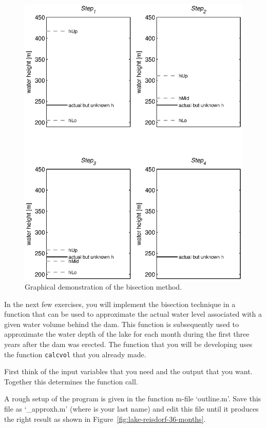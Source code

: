 \begin{figure}[htbp]
  \centering
    \includegraphics[width=1.0\textwidth]{./../eps/water-levels.eps}
  \caption{Graphical demonstration of the bisection method.}
  \label{fig:water-levels}
\end{figure}


\noindent In the next few exercises, you will implement the bisection technique in a function that can be used to approximate the actual water level associated with a given water volume behind the dam. This function is subsequently used to approximate the water depth of the lake for each month during the first three years after the dam was erected. The function that you will be developing uses the function {\tt calcvol} that you already made.


\begin{action}
First think of the input variables that you need and the output that you want. Together this determines the function call.
\end{action}
\begin{action}
A rough setup of the program is given in the function m-file `outline.m'. Save this file as `\_approxh.m' (where  is your last name) and edit this file until it produces the right result as shown in Figure~\ref{fig:lake-reisdorf-36-months}.
\end{action} 

